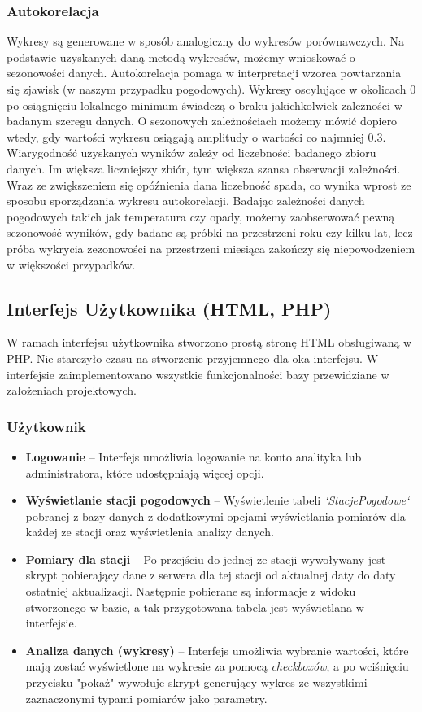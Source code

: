 \documentclass[12pt,a4paper]{article}
\begin{document}
\subsubsection{Autokorelacja}
Wykresy są generowane w sposób analogiczny do wykresów porównawczych.
Na podstawie uzyskanych daną metodą wykresów, możemy wnioskować o sezonowości danych. Autokorelacja pomaga w interpretacji wzorca powtarzania się zjawisk (w naszym przypadku pogodowych). Wykresy oscylujące w okolicach 0 po osiągnięciu lokalnego minimum świadczą o braku jakichkolwiek zależności w badanym szeregu danych. O sezonowych zależnościach możemy mówić dopiero wtedy, gdy wartości wykresu osiągają amplitudy o wartości co najmniej 0.3. Wiarygodność uzyskanych wyników zależy od liczebności badanego zbioru danych. Im większa liczniejszy zbiór, tym większa szansa obserwacji zależności. Wraz ze zwiększeniem się opóźnienia dana liczebność spada, co wynika wprost ze sposobu sporządzania wykresu autokorelacji.
Badając zależności danych pogodowych takich jak temperatura czy opady, możemy zaobserwować pewną sezonowość wyników, gdy badane są próbki na przestrzeni roku czy kilku lat, lecz próba wykrycia zezonowości na przestrzeni miesiąca zakończy się niepowodzeniem w większości przypadków.
\subsection{Interfejs Użytkownika (HTML, PHP)}
W ramach interfejsu użytkownika stworzono prostą stronę HTML obsługiwaną w PHP. Nie starczyło czasu na stworzenie przyjemnego dla oka interfejsu. W interfejsie zaimplementowano wszystkie funkcjonalności bazy przewidziane w założeniach projektowych.
\subsubsection{Użytkownik}
\begin{itemize}
\item \textbf{Logowanie} -- Interfejs umożliwia logowanie na konto analityka lub administratora, które udostępniają więcej opcji.
\item \textbf{Wyświetlanie stacji pogodowych} -- Wyświetlenie tabeli \textit{`StacjePogodowe`} pobranej z bazy danych z dodatkowymi opcjami wyświetlania pomiarów dla każdej ze stacji oraz wyświetlenia analizy danych.
\item \textbf{Pomiary dla stacji} -- Po przejściu do jednej ze stacji wywoływany jest skrypt pobierający dane z serwera dla tej stacji od aktualnej daty do daty ostatniej aktualizacji. Następnie pobierane są informacje z widoku stworzonego w bazie, a tak przygotowana tabela jest wyświetlana w interfejsie.
\item \textbf{Analiza danych (wykresy)} -- Interfejs umożliwia wybranie wartości, które mają zostać wyświetlone na wykresie za pomocą \textit{checkboxów}, a po wciśnięciu przycisku "pokaż" wywołuje skrypt generujący wykres ze wszystkimi zaznaczonymi typami pomiarów jako parametry.
\end{itemize}
\end{document}
